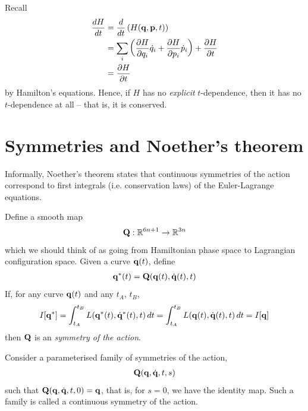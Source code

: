 \documentclass{../template/note}
\begin{document}
    \begin{remark*}
        Recall
        \begin{align*}
            \frac{dH}{dt} &= \frac{d}{dt}\left(H(\V q, \V p, t)\right) \\
            &= \sum_i \left(\pd{H}{q_i} \dot q_i + \pd{H}{p_i} \dot p_i\right) + \pd{H}{t} \\
            &= \pd{H}{t}
        \end{align*}
        by Hamilton's equations. Hence, if $H$ has no \emph{explicit} $t$-dependence, then it has no $t$-dependence at all -- that is, it is conserved.        
    \end{remark*}
    
    \section{Symmetries and Noether's theorem}

    Informally, Noether's theorem states that continuous symmetries of the action correspond to first integrals (i.e. conservation laws) of the Euler-Lagrange equations.

    \begin{definition}
        Define a smooth map
        \begin{align*}
            \V Q: \RR^{6n+1} \to \RR^{3n}
        \end{align*}
        which we should think of as going from Hamiltonian phase space to Lagrangian configuration space. Given a curve $\V q(t)$, define
        \begin{align*}
            \V q^*(t) = \V Q(\V q(t), \dot{\V q}(t), t)
        \end{align*}
        If, for any curve $\V q(t)$ and any $t_A$, $t_B$,
        \begin{align*}
            I[\V q^*] = \int_{t_A}^{t_B} L(\V q^*(t), \dot{\V q}^*(t), t) \D t = \int_{t_A}^{t_B} L(\V q(t), \dot{\V q}(t), t) \D t = I[\V q]
        \end{align*}
        then $\V Q$ is an \emph{symmetry of the action}.        
    \end{definition}
    
    \begin{definition}
        Consider a parameterised family of symmetries of the action,
        \begin{align*}
            \V Q(\V q, \dot{\V q}, t, s)
        \end{align*}
        such that $\V Q(\V q, \dot{\V q}, t, 0) = \V q$, that is, for $s=0$, we have the identity map. Such a family is called a continuous symmetry of the action.  
    \end{definition}
    
\end{document}
